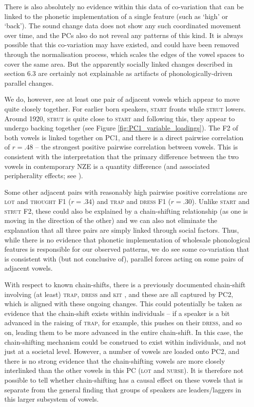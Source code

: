 \documentclass[review]{elsarticle} %
\begin{document}
There is also absolutely no evidence within this data of co-variation that can be linked to the phonetic implementation of a single feature (such as `high' or `back').  The sound change data does not show any such coordinated movement over time, and the PCs also do not reveal any patterns of this kind.  It is always possible that this co-variation may have existed, and could have been removed through the normalisation process, which scales the edges of the vowel spaces to cover the same area. But the apparently socially linked changes described in section 6.3 are certainly not explainable as artifacts of phonologically-driven parallel changes.

We do, however, see at least one pair of adjacent vowels which appear to move quite closely together. For earlier born speakers, \textsc{start} fronts while \textsc{strut} lowers.  Around 1920, \textsc{strut} is quite close to \textsc{start} and following this, they appear to undergo backing together (see Figure \ref{fig:PC1_variable_loadings}).  The F2 of both vowels is linked together on PC1, and there is a direct pairwise correlation of $r = .48$ -- the strongest positive pairwise correlation between vowels.  This is consistent with the interpretation that the primary difference between the two vowels in contemporary NZE is a quantity difference (and associated peripherality effects; see \citealt{warren2006oops, bauer2008new, warren2018quality}).

Some other adjacent pairs with reasonably high pairwise positive correlations are \textsc{lot} and \textsc{thought} F1 ($r = .34$) and \textsc{trap} and \textsc{dress} F1 ($r = .30$).  Unlike \textsc{start} and \textsc{strut} F2, these could also be explained by a chain-shifting relationship (as one is moving in the direction of the other) and we can also not eliminate the explanation that all three pairs are simply linked through social factors.  Thus, while there is no evidence that phonetic implementation of wholesale phonological features is responsible for our observed patterns, we do see some co-variation that is consistent with (but not conclusive of), parallel forces acting on some pairs of adjacent vowels.

With respect to known chain-shifts, there is a previously documented chain-shift involving (at least) \textsc{trap}, \textsc{dress} and \textsc{kit} \citep{hay2015tracking}, and these are all captured by PC2, which is aligned with these ongoing changes.  This could potentially be taken as evidence that the chain-shift exists within individuals -- if a speaker is a bit advanced in the raising of \textsc{trap}, for example, this pushes on their \textsc{dress}, and so on, leading them to be more advanced in the entire chain-shift. In this case, the chain-shifting mechanism could be construed to exist within individuals, and not just at a societal level.  However, a number of vowels are loaded onto PC2, and there is no strong evidence that the chain-shifting vowels are more closely interlinked than the other vowels in this PC (\textsc{lot} and \textsc{nurse}).  It is therefore not possible to tell whether chain-shifting has a causal effect on these vowels that is separate from the general finding that groups of speakers are leaders/laggers in this larger subsystem of vowels.
\end{document}
